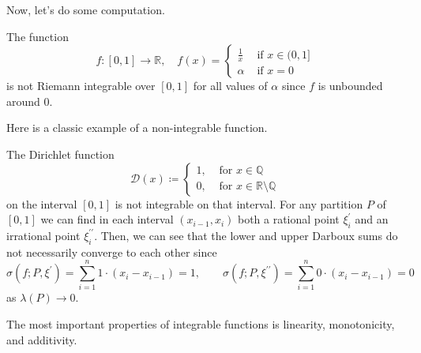   Now, let's do some computation. 

  \begin{example}
    \label{ex:an-unbounded-function-is-not-riemann-integrable}
    The function 
    \begin{equation}
      f: [0, 1] \to \mathbb{R}, \quad f(x) = \begin{cases} 
        \frac{1}{x} & \text{ if } x \in (0, 1] \\ 
        \alpha & \text{ if } x = 0 
      \end{cases}
    \end{equation}
    is not Riemann integrable over $[0, 1]$ for all values of $\alpha$ since $f$ is unbounded around $0$. 
  \end{example}

  Here is a classic example of a non-integrable function.  

  \begin{example}
    \label{ex:non-integrability-of-the-dirichlet-function}
    The Dirichlet function
    \begin{equation}
      \mathcal{D}(x) \coloneqq \begin{cases}
        1, & \text{ for } x \in \mathbb{Q} \\
        0, & \text{ for } x \in \mathbb{R} \setminus \mathbb{Q}
      \end{cases}
    \end{equation}
    on the interval $[0,1]$ is not integrable on that interval. For any partition $P$ of $[0,1]$ we can find in each interval $(x_{i-1}, x_i)$ both a rational point $\xi^\prime_i$ and an irrational point $\xi_i^{\prime\prime}$. Then, we can see that the lower and upper Darboux sums do not necessarily converge to each other since
    \begin{equation}
      \sigma(f; P, \xi^\prime) = \sum_{i=1}^n 1 \cdot (x_i - x_{i-1}) = 1, \qquad \sigma(f;P, \xi^{\prime\prime}) = \sum_{i=1}^n 0 \cdot (x_i - x_{i-1}) = 0
    \end{equation}
    as $\lambda(P) \rightarrow 0$. 
  \end{example}

  The most important properties of integrable functions is linearity, monotonicity, and additivity. 

